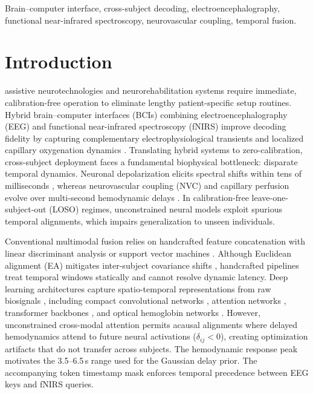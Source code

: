 \documentclass[journal]{IEEEtran}
\begin{document}
\begin{IEEEkeywords}
Brain--computer interface, cross-subject decoding, electroencephalography, functional near-infrared spectroscopy, neurovascular coupling, temporal fusion.
\end{IEEEkeywords}

\section{Introduction}
\label{sec:intro}
 assistive neurotechnologies and neurorehabilitation systems require immediate, calibration-free operation to eliminate lengthy patient-specific setup routines. Hybrid brain--computer interfaces (BCIs) combining electroencephalography (EEG) and functional near-infrared spectroscopy (fNIRS) improve decoding fidelity by capturing complementary electrophysiological transients and localized capillary oxygenation dynamics \cite{fazli2012enhanced, shin2017open, li2022hybrid}. Translating hybrid systems to zero-calibration, cross-subject deployment faces a fundamental biophysical bottleneck: disparate temporal dynamics. Neuronal depolarization elicits spectral shifts within tens of milliseconds \cite{buzsaki2012origin, pfurtscheller1999event}, whereas neurovascular coupling (NVC) and capillary perfusion evolve over multi-second hemodynamic delays \cite{buxton1998dynamics, attwell2010glial, iadecola2004neurovascular}. In calibration-free leave-one-subject-out (LOSO) regimes, unconstrained neural models exploit spurious temporal alignments, which impairs generalization to unseen individuals.

Conventional multimodal fusion relies on handcrafted feature concatenation with linear discriminant analysis or support vector machines \cite{fazli2012enhanced, buccino2016hybrid, aydin2020subject}. Although Euclidean alignment (EA) mitigates inter-subject covariance shifts \cite{he2020transfer, zanini2018transfer, yger2017review}, handcrafted pipelines treat temporal windows statically and cannot resolve dynamic latency. Deep learning architectures capture spatio-temporal representations from raw biosignals \cite{lawhern2018eegnet, blankertz2008optimizing, lotte2018review}, including compact convolutional networks \cite{lawhern2018eegnet}, attention networks \cite{altaheri2023atcnet}, transformer backbones \cite{song2022eeg}, and optical hemoglobin networks \cite{scholkmann2014review, pandey2024fnirsnet}. However, unconstrained cross-modal attention \cite{vaswani2017attention} permits acausal alignments where delayed hemodynamics attend to future neural activations ($\delta_{ij} < 0$), creating optimization artifacts that do not transfer across subjects. The hemodynamic response peak \cite{buxton1998dynamics, glover1999deconvolution} motivates the 3.5--6.5\,s range used for the Gaussian delay prior. The accompanying token timestamp mask enforces temporal precedence between EEG keys and fNIRS queries.
\end{document}
